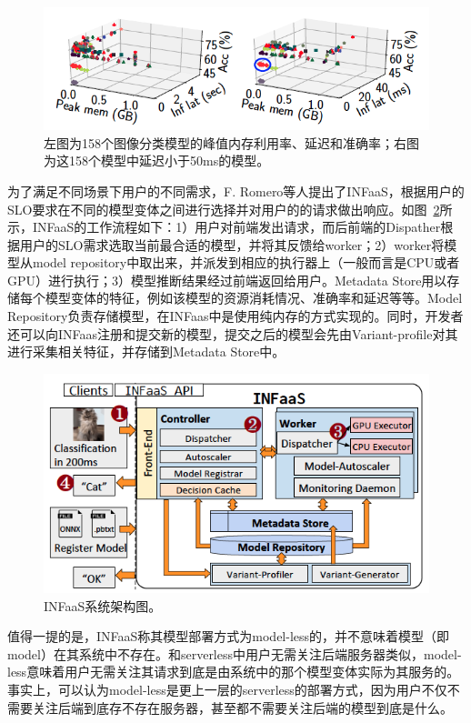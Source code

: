 \begin{figure}[h]
    \centerline{\includegraphics[width=\textwidth]{figures/model-variants.png}}
    \caption{左图为158个图像分类模型的峰值内存利用率、延迟和准确率；右图为这158个模型中延迟小于50ms的模型。}
    \label{model_variants}
\end{figure}

为了满足不同场景下用户的不同需求，F. Romero等人提出了INFaaS，根据用户的SLO要求在不同的模型变体之间进行选择并对用户的的请求做出响应。如图~\ref{infaas_arch}所示，INFaaS的工作流程如下：1）用户对前端发出请求，而后前端的Dispather根据用户的SLO需求选取当前最合适的模型，并将其反馈给worker；2）worker将模型从model repository中取出来，并派发到相应的执行器上（一般而言是CPU或者GPU）进行执行；3）模型推断结果经过前端返回给用户。Metadata Store用以存储每个模型变体的特征，例如该模型的资源消耗情况、准确率和延迟等等。Model Repository负责存储模型，在INFaas中是使用纯内存的方式实现的。同时，开发者还可以向INFaas注册和提交新的模型，提交之后的模型会先由Variant-profile对其进行采集相关特征，并存储到Metadata Store中。

\begin{figure}[h]
    \centerline{\includegraphics[width=\textwidth]{figures/infaas-arch.png}}
    \caption{INFaaS系统架构图。}
    \label{infaas_arch}
\end{figure}

值得一提的是，INFaaS称其模型部署方式为model-less的，并不意味着模型（即model）在其系统中不存在。和serverless中用户无需关注后端服务器类似，model-less意味着用户无需关注其请求到底是由系统中的那个模型变体实际为其服务的。事实上，可以认为model-less是更上一层的serverless的部署方式，因为用户不仅不需要关注后端到底存不存在服务器，甚至都不需要关注后端的模型到底是什么。

